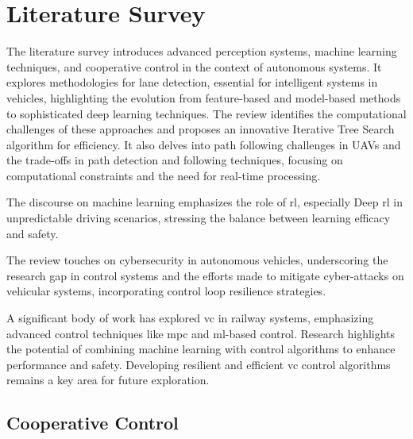 \chapter{Literature Survey}
\label{literature_review}


The literature survey introduces advanced perception systems, machine learning techniques, and cooperative control in the context of autonomous systems. It explores methodologies for lane detection, essential for intelligent systems in vehicles, highlighting the evolution from feature-based and model-based methods to sophisticated deep learning techniques. The review identifies the computational challenges of these approaches and proposes an innovative Iterative Tree Search algorithm for efficiency. It also delves into path following challenges in UAVs and the trade-offs in path detection and following techniques, focusing on computational constraints and the need for real-time processing. 

The discourse on machine learning emphasizes the role of \gls{rl}, especially Deep \gls{rl} in unpredictable driving scenarios, stressing the balance between learning efficacy and safety. 

The review touches on cybersecurity in autonomous vehicles, underscoring the research gap in control systems and the efforts made to mitigate cyber-attacks on vehicular systems, incorporating control loop resilience strategies.

A significant body of work has explored \gls{vc} in railway systems, emphasizing advanced control techniques like \gls{mpc} and \gls{ml}-based control. Research highlights the potential of combining machine learning with control algorithms to enhance performance and safety. Developing resilient and efficient \gls{vc} control algorithms remains a key area for future exploration.


\newpage





\section{ Cooperative Control}




